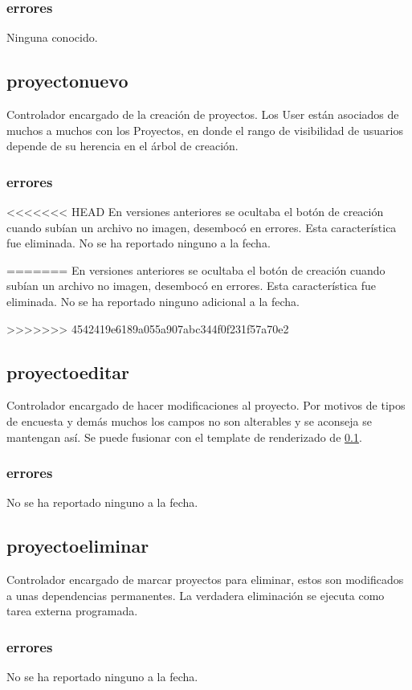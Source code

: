 \documentclass[10pt,a4paper]{book}
\begin{document}
	\subsubsection{errores}
	Ninguna conocido.


	\subsection{proyectonuevo}\label{proyectonuevo}
	Controlador encargado de la creación de proyectos. Los User están asociados de muchos a muchos con los Proyectos, en donde el rango de visibilidad de usuarios depende de su herencia en el árbol de creación.
	\subsubsection{errores}
<<<<<<< HEAD
	En versiones anteriores se ocultaba el botón de creación cuando subían un archivo no imagen, desembocó en errores. Esta característica fue eliminada. No se ha reportado ninguno a la fecha.

=======
	En versiones anteriores se ocultaba el botón de creación cuando subían un archivo no imagen, desembocó en errores. Esta característica fue eliminada. No se ha reportado ninguno adicional a la fecha.
	
>>>>>>> 4542419e6189a055a907abc344f0f231f57a70e2
	\subsection{proyectoeditar}
	Controlador encargado de hacer modificaciones al proyecto. Por motivos de tipos de encuesta y demás muchos los campos no son alterables y se aconseja se mantengan así. Se puede fusionar con el template de renderizado de \ref{proyectonuevo}.
	\subsubsection{errores}
	No se ha reportado ninguno a la fecha.

	\subsection{proyectoeliminar}
	Controlador encargado de marcar proyectos para eliminar, estos son modificados a unas dependencias permanentes. La verdadera eliminación se ejecuta como tarea externa programada.
	\subsubsection{errores}
	No se ha reportado ninguno a la fecha.
\end{document}
